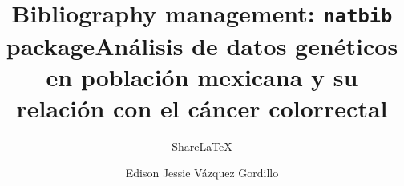 \documentclass[oneside,11pt]{Latex/Classes/thesisUMSNH}
\title{Bibliography management: \texttt{natbib} package}
\author{Share\LaTeX}
\date {}
\title{An\'alisis de datos gen\'eticos en población mexicana y su relación con el c\'ancer colorrectal}
\author{Edison Jessie Vázquez Gordillo}
\begin{document}
\renewcommand{\bibname}{Bibliograf\'ia}
\renewcommand{\contentsname}{Contenido}
\renewcommand{\listfigurename}{Lista de Figuras}
\renewcommand{\listtablename}{Lista de Tablas}

\maketitle									%



\frontmatter


\setcounter{secnumdepth}{3} %
\setcounter{tocdepth}{4}    %
\tableofcontents            %


\mainmatter
\def\baselinestretch{1.5}                   %


\listoffigures              %
\listoftables               %
\end{document}
